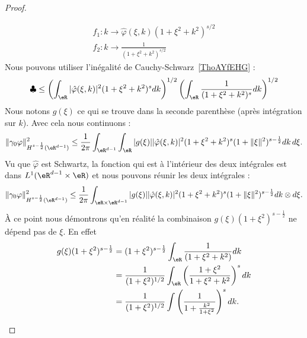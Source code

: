 \begin{proof}
\begin{subproof}
\begin{subequations}
                \begin{align}
                    f_1\colon k\to \hat \varphi(\xi,k)(1+\xi^2+k^2)^{s/2}\\
                    f_2\colon k\to \frac{1}{ (1+\xi^2+k^2)^{s/2} }
                \end{align}
            \end{subequations}
            Nous pouvons utiliser l'inégalité de Cauchy-Schwarz~\ref{ThoAYfEHG} :
            \begin{equation}
                \clubsuit\leq \left( \int_{\eR}| \hat \varphi(\xi,k) |^2(1+\xi^2+k^2)^sdk \right)^{1/2}\left( \int_{\eR}\frac{1}{ (1+\xi^2+k^2)^s }dk \right)^{1/2}
            \end{equation}
            Nous notons \( g(\xi)\) ce qui se trouve dans la seconde parenthèse (après intégration sur \( k\)). Avec cela nous continuons :
            \begin{equation}
                \| \gamma_0\varphi \|^2_{H^{s-\frac{ 1 }{2}}(\eR^{d-1})}\leq\frac{1}{ 2\pi }\int_{\eR^{d-1}}\int_{\eR}| g(\xi) | |\hat \varphi(\xi,k) |^2(1+\xi^2+k^2)^s(1+\| \xi \|^2)^{s-\frac{ 1 }{2}}dk\,d\xi.
            \end{equation}
            Vu que \( \hat \varphi\) est Schwartz, la fonction qui est à l'intérieur des deux intégrales est dans \( L^1(\eR^{d-1}\times \eR)\) et nous pouvons réunir les deux intégrales :
            \begin{equation}
                \| \gamma_0\varphi \|^2_{H^{s-\frac{ 1 }{2}}(\eR^{d-1})}\leq\frac{1}{ 2\pi }\int_{\eR\times \eR^{d-1}}| g(\xi) | |\hat \varphi(\xi,k) |^2(1+\xi^2+k^2)^s(1+\| \xi \|^2)^{s-\frac{ 1 }{2}}dk\otimes d\xi.
            \end{equation}
            À ce point nous démontrons qu'en réalité la combinaison \( g(\xi)(1+\xi^2)^{s-\frac{ 1 }{2}}\) ne dépend pas de \( \xi\). En effet
            \begin{subequations}
                \begin{align}
                    g(\xi)(1+\xi^2)^{s-\frac{ 1 }{2}}&=(1+\xi^2)^{s-\frac{ 1 }{2}}\int_{\eR}\frac{1}{ (1+\xi^2+k^2) }dk\\
                    &=\frac{1}{ (1+\xi^2)^{1/2} }\int_{\eR}\left( \frac{ 1+\xi^2 }{ 1+\xi^2+k^2 } \right)^sdk\\
                    &=\frac{1}{ (1+\xi^2)^{1/2} }\int\left( \frac{1}{ 1+\frac{ k^2 }{ 1+\xi^2 } } \right)^sdk.
                \end{align}
            \end{subequations}

\end{subproof}
\end{proof}
